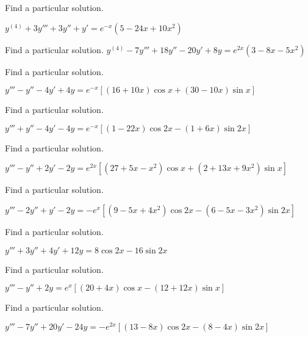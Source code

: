\documentclass{ximera}
\begin{document}
\begin{problem}\label{exer:9.3.27}   Find a particular solution.

$y^{(4)}+3y'''+3y''+y'=e^{-x}(5-24x+10x^2)$
\end{problem}

\begin{problem}\label{exer:9.3.28}   Find a particular solution.   $y^{(4)}-7y'''+18y''-20y'+8y=e^{2x}(3-8x-5x^2)$
\end{problem}

\begin{problem}\label{exer:9.3.29}   Find a particular solution.

$y'''-y''-4y'+4y=e^{-x}\left[(16+10x)\cos
x+(30-10x)\sin x\right]$
\end{problem}

\begin{problem}\label{exer:9.3.30}   Find a particular solution.

$y'''+y''-4y'-4y=e^{-x}\left[(1-22x)\cos
2x-(1+6x)\sin2x\right]$
\end{problem}

\begin{problem}\label{exer:9.3.31}   Find a particular solution.

$y'''-y''+2y'-2y=e^{2x}[(27+5x-x^2)\cos
x+(2+13x+9x^2)\sin x]$
\end{problem}

\begin{problem}\label{exer:9.3.32}   Find a particular solution.

$y'''-2y''+y'-2y=-e^x[(9-5x+4x^2)\cos
2x-(6-5x-3x^2)\sin2x]$
\end{problem}

\begin{problem}\label{exer:9.3.33}   Find a particular solution.

$y'''+3y''+4y'+12y=8\cos2x-16\sin2x$
\end{problem}

\begin{problem}\label{exer:9.3.34}   Find a particular solution. 

$y'''-y''+2y=e^x[(20+4x)\cos x-(12+12x)\sin
 x]$
\end{problem}
 
\begin{problem}\label{exer:9.3.35}   Find a particular solution.

$y'''-7y''+20y'-24y=-e^{2x}[(13-8x)\cos
2x-(8-4x)\sin2x]$
\end{problem}
\end{document}
